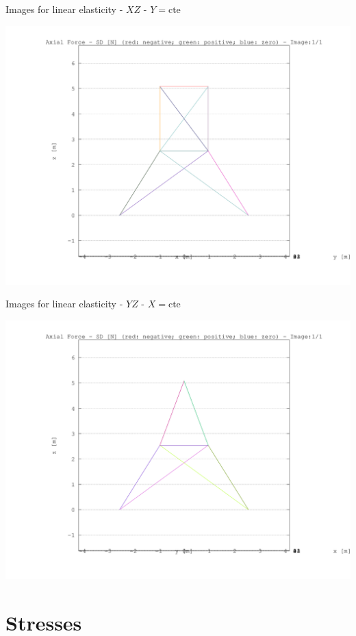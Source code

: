 \documentclass[a4paper,11pt]{article}
\begin{document}
\begin{center}       
Images for linear elasticity -  $XZ$ - $Y=\text{cte}$ 

\includegraphics[width=.80\textwidth]{../../XY_XZ_YZ/XZ/axial_force/torre_axial_force_XZ_1.png}      

\end{center}       
\newpage       
\begin{center}       
Images for linear elasticity -  $YZ$ - $X=\text{cte}$ 

\includegraphics[width=.80\textwidth]{../../XY_XZ_YZ/YZ/axial_force/torre_axial_force_YZ_1.png}      

\end{center}       
\newpage       

\section{Stresses}
\end{document}
